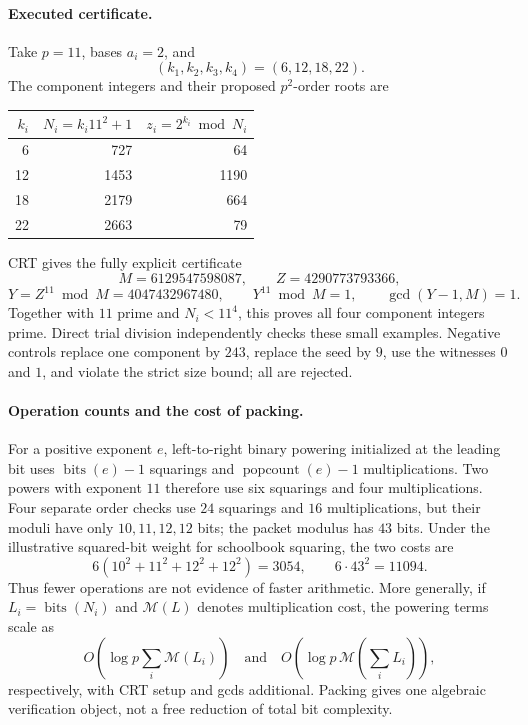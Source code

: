 \documentclass[11pt,a4paper]{article}
\theoremstyle{definition}\newtheorem{definition}[theorem]{Definition}
\theoremstyle{remark}\newtheorem{remark}[theorem]{Remark}
\newcommand{\bits}{\operatorname{bits}}\newcommand{\Norm}{\operatorname{N}}
\begin{document}
\paragraph{Executed certificate.}
Take $p=11$, bases $a_i=2$, and
\[
 (k_1,k_2,k_3,k_4)=(6,12,18,22).
\]
The component integers and their proposed $p^2$-order roots are
\begin{center}\small
\begin{tabular}{@{}rrr@{}}
\toprule
$k_i$ & $N_i=k_i11^2+1$ & $z_i=2^{k_i}\bmod N_i$\\
\midrule
6 & 727 & 64\\
12 & 1453 & 1190\\
18 & 2179 & 664\\
22 & 2663 & 79\\
\bottomrule
\end{tabular}
\end{center}
CRT gives the fully explicit certificate
\[
 M=6129547598087,\qquad Z=4290773793366,
\]
\[
 Y=Z^{11}\bmod M=4047432967480,\qquad
 Y^{11}\bmod M=1,\qquad\gcd(Y-1,M)=1.
\]
Together with $11$ prime and $N_i<11^4$, this proves all four component
integers prime. Direct trial division independently checks these small
examples. Negative controls replace one component by $243$, replace the
seed by $9$, use the witnesses $0$ and $1$, and violate the strict size
bound; all are rejected.

\paragraph{Operation counts and the cost of packing.}
For a positive exponent $e$, left-to-right binary powering initialized at
the leading bit uses $\bits(e)-1$ squarings and
$\operatorname{popcount}(e)-1$ multiplications. Two powers with exponent
$11$ therefore use six squarings and four multiplications. Four separate
order checks use $24$ squarings and $16$ multiplications, but their moduli
have only $10,11,12,12$ bits; the packet modulus has $43$ bits.
Under the illustrative squared-bit weight for schoolbook squaring, the
two costs are
\[
 6(10^2+11^2+12^2+12^2)=3054,\qquad6\cdot43^2=11094.
\]
Thus fewer operations are not evidence of faster arithmetic. More generally,
if $L_i=\bits(N_i)$ and $\mathcal M(L)$ denotes multiplication cost, the
powering terms scale as
\[
 O\!\left(\log p\sum_i\mathcal M(L_i)\right)
 \quad\text{and}\quad
 O\!\left(\log p\,\mathcal M\!\left(\sum_iL_i\right)\right),
\]
respectively, with CRT setup and gcds additional. Packing gives one
algebraic verification object, not a free reduction of total bit complexity.
\end{document}
